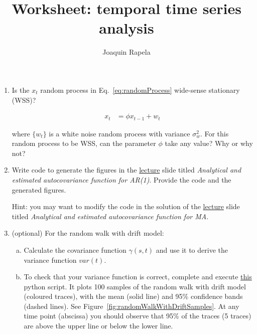 \documentclass[12pt]{article}
\title{Worksheet: temporal time series analysis}
\author{Joaquin Rapela}
\begin{document}
\maketitle

\begin{enumerate}

    \item Is the $x_t$ random process in Eq.~\ref{eq:randomProcess} wide-sense
        stationary (WSS)?

        \begin{align}
            x_t & = \phi x_{t-1} + w_t\label{eq:randomProcess}
        \end{align}

        where $\{w_t\}$ is a white noise random process with variance
        $\sigma^2_w$. For this random process to be WSS, can the parameter
        $\phi$ take any value? Why or why not?

    \item Write code to generate the figures in the
        \href{https://github.com/joacorapela/statNeuro2025/blob/master/lectures/01_temporalTimeSeriesAnalysis/temporalTimeSeriesAnalysis.pdf}{lecture}
        slide titled \emph{Analytical and estimated autocovariance function for
        AR(1)}. Provide the code and the generated figures.

        Hint: you may want to modify the code in the solution of the
        \href{https://github.com/joacorapela/statNeuro2025/blob/master/lectures/01_temporalTimeSeriesAnalysis/temporalTimeSeriesAnalysis.pdf}{lecture}
        slide titled \emph{Analytical and estimated autocovariance function for MA}.

    \item (optional) For the random walk with drift model:

        \begin{enumerate}[(a)]

            \item Calculate the covariance function $\gamma(s, t)$ and use it
                to derive the variance function $var(t)$.

            \item To check that your variance function is correct, complete and
                execute
                \href{https://github.com/joacorapela/statNeuro2025/blob/master/worksheets/01_temporalTimeSeriesAnalysis/plot_samplesRandomWalkWithDrift.py}{this}
                python script. It plots 100 samples of the random walk with
                drift model (coloured traces), with the mean (solid line) and
                95\% confidence bands (dashed lines). See
                Figure~\ref{fig:randomWalkWithDriftSamples}. At any time point
                (abscissa) you should observe that 95\% of the traces (5
                traces) are above the upper line or below the lower line.



\end{enumerate}
\end{enumerate}
\end{document}
